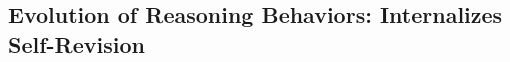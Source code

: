 




\subsection{Evolution of Reasoning Behaviors: \ours{} Internalizes Self-Revision}\label{sec:behavioral_analysis}

